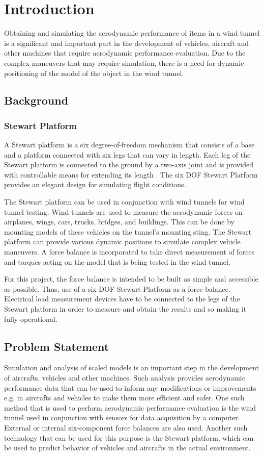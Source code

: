 \chapter{Introduction}
\label{sec:introduction}
Obtaining and simulating the aerodynamic performance of items in a wind tunnel is a
significant and important part in the development of vehicles, aircraft and other machines
that require aerodynamic performance evaluation. Due to the complex maneuvers that
may require simulation, there is a need for dynamic positioning of the model of the object
in the wind tunnel.
\section{Background}
\subsection{Stewart Platform}
A Stewart platform is a six degree-of-freedom mechanism that consists of a base and a platform connected with six legs that can vary in length. Each leg of the Stewart platform is connected to the ground by a two-axis joint and is provided with controllable means for extending its length
\cite{wittenburg2016stewart}. The six DOF Stewart Platform provides an elegant design for simulating flight conditions.\cite{stewart1965platform}. 

The Stewart platform can be used in conjunction with wind tunnels for wind tunnel testing. Wind tunnels are used to measure the aerodynamic forces on airplanes, wings, cars, trucks, bridges, and buildings. This can be done by mounting models of these vehicles on the tunnel's mounting sting. The Stewart platform can provide various dynamic positions to simulate complex vehicle maneuvers. A force balance is incorporated to take direct measurement of forces and torques acting on the model that is being tested in the wind tunnel.

For this project, the force balance is intended to be built as simple and accessible as possible. Thus, use of a six DOF Stewart Platform as a force balance. Electrical load measurement devices have to be connected to the legs of the Stewart platform in order to measure and obtain the results and so making it fully operational.

\section{Problem Statement}
Simulation and analysis of scaled models is an important step in the development of aircrafts, vehicles and other machines. Such analysis provides aerodynamic performance data that can be used to inform any modifications or improvements e.g. in aircrafts and vehicles to make them more efficient and safer. One such method that is used to perform aerodynamic performance evaluation is the wind tunnel used in conjunction with sensors for data acquisition by a computer. External or internal six-component force balances are also used. Another such technology that can be used for this purpose is the Stewart platform, which can be used to predict behavior of vehicles and aircrafts in the actual environment.

